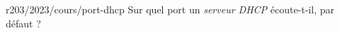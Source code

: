 \begin{question}{r203/2023/cours/port-dhcp}
  Sur quel port un {\em serveur DHCP} écoute-t-il, par défaut ?
  \begin{reponses}
  \end{reponses}
\end{question}

